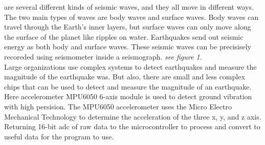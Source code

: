 \documentclass{article}
\begin{document}
 are several different kinds of seismic waves, and they all move in different ways.  The two main types of waves are body waves and surface waves. Body waves can travel through the Earth's inner layers, but surface waves can only move along the surface of the planet like ripples on water. Earthquakes send out seismic energy as both body and surface waves. These seismic waves can be precisisely recoreded using seismometer inside a seismograph\cite*{SiesWav}. \textit{see figure 1.} \\

\noindent Large organizations use complex systems to detect earthquakes and measure the magnitude of the earthquake was. But also, there are small and less complex chips that can be used to detect and measure the magnitude of an earthquake. Here accelerometer MPU6050 6-axis module is used to detect ground vibration with high persision. The MPU6050 accelerometer uses the Micro Electro Mechanical Technology to determine the acceleration of the three x, y, and z axis. Returning 16-bit adc of raw data to the microcontroller to process and convert to useful data for the program to use.



\newpage

\printbibliography
\end{document}
